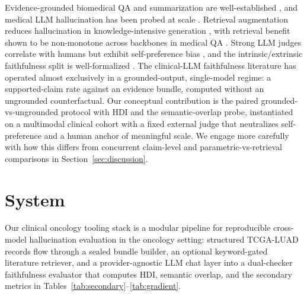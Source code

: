 \documentclass{article}
\theoremstyle{plain}
\begin{document}
Evidence-grounded biomedical QA and summarization are well-established \citep{tsatsaronis2015bioasq,deyoung2021ms2}, and medical LLM hallucination has been probed at scale \citep{pal2023medhalt,singhal2023largelanguagemodelsencode}. Retrieval augmentation reduces hallucination in knowledge-intensive generation \citep{lewis2020rag,shuster2021retrieval}, with retrieval benefit shown to be non-monotone across backbones in medical QA \citep{xiong2024benchmarking}. Strong LLM judges correlate with humans but exhibit self-preference bias \citep{zheng2023judging,panickssery2024llm}, and the intrinsic/extrinsic faithfulness split is well-formalized \citep{ji2023survey,maynez2020faithfulness}. The clinical-LLM faithfulness literature has operated almost exclusively in a grounded-output, single-model regime: a supported-claim rate against an evidence bundle, computed without an ungrounded counterfactual. Our conceptual contribution is the paired grounded-vs-ungrounded protocol with HDI and the semantic-overlap probe, instantiated on a multimodal clinical cohort with a fixed external judge that neutralizes self-preference and a human anchor of meaningful scale. We engage more carefully with how this differs from concurrent claim-level and parametric-vs-retrieval comparisons in Section~\ref{sec:discussion}.

\section{System}
\label{sec:system}

Our clinical oncology tooling stack is a modular pipeline for reproducible cross-model hallucination evaluation in the oncology setting: structured TCGA-LUAD records flow through a sealed bundle builder, an optional keyword-gated literature retriever, and a provider-agnostic LLM chat layer into a dual-checker faithfulness evaluator that computes HDI, semantic overlap, and the secondary metrics in Tables~\ref{tab:secondary}--\ref{tab:gradient}.
\end{document}
